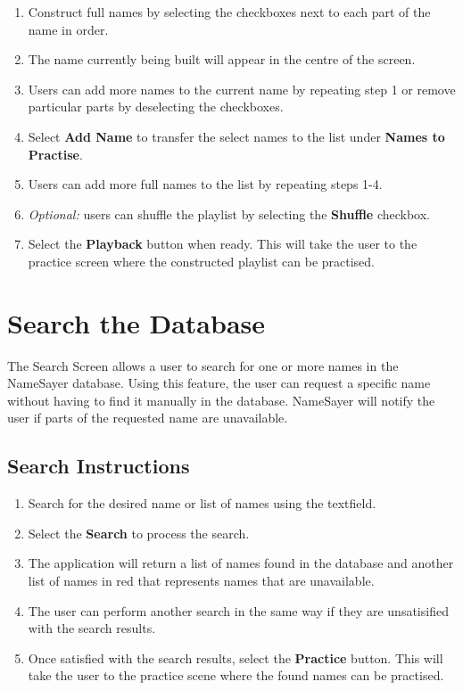\documentclass{article}
\begin{document}
\begin{enumerate}
	\item Construct full names by selecting the checkboxes next to each part of the name in order.

	\item The name currently being built will appear in the centre of the screen.

	\item Users can add more names to the current name by repeating step 1 or remove particular parts by deselecting the checkboxes.

	\item Select \textbf{Add Name} to transfer the select names to the list under \textbf{Names to Practise}.

	\item Users can add more full names to the list by repeating steps 1-4.

	\item {\em Optional: } users can shuffle the playlist by selecting the \textbf{Shuffle} checkbox.

	\item Select the \textbf{Playback} button when ready. This will take the user to the practice screen where the constructed playlist can be practised.
\end{enumerate}

\section{Search the Database}
The Search Screen allows a user to search for one or more names in the NameSayer database. Using this feature, the user can request a specific name without having to find it manually in the database. NameSayer will notify the user if parts of the requested name are unavailable.

\subsection{Search Instructions}

\begin{enumerate}
	\item Search for the desired name or list of names using the textfield.

	\item Select the \textbf{Search} to process the search.

	\item The application will return a list of names found in the database and another list of names in red that represents names that are unavailable.

	\item The user can perform another search in the same way if they are unsatisified with the search results.

	\item Once satisfied with the search results, select the \textbf{Practice} button. This will take the user to the practice scene
	where the found names can be practised.
\end{enumerate}
\end{document}
